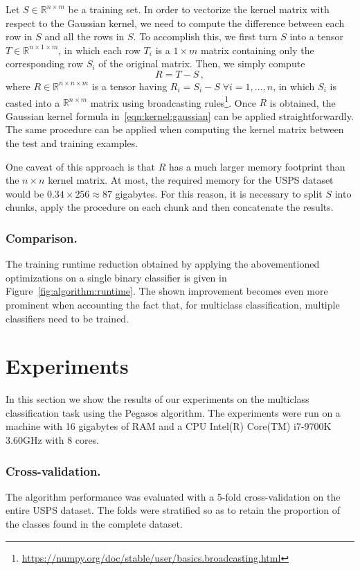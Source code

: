 \documentclass[runningheads]{llncs}
\begin{document}
Let $S \in \mathbb{R}^{n \times m}$ be a training set. In order to vectorize the kernel matrix with respect to the Gaussian kernel, we need to compute the difference between each row in $S$ and all the rows in $S$. To accomplish this, we first turn $S$ into a tensor $T \in \mathbb{R}^{n \times 1 \times m}$, in which each row $T_i$ is a $1 \times m$ matrix containing only the corresponding row $S_i$ of the original matrix. Then, we simply compute
\[
  R = T - S \, ,
\]
where $R \in \mathbb{R}^{n \times n \times m}$ is a tensor having $R_i = S_i - S \; \forall i=1,\dots,n$, in which $S_i$ is casted into a $\mathbb{R}^{n \times m}$ matrix using broadcasting rules\footnote{\url{https://numpy.org/doc/stable/user/basics.broadcasting.html}}. Once $R$ is obtained, the Gaussian kernel formula in~\ref{eqn:kernel:gaussian} can be applied straightforwardly. The same procedure can be applied when computing the kernel matrix between the test and training examples.

One caveat of this approach is that $R$ has a much larger memory footprint than the $n \times n$ kernel matrix. At most, the required memory for the USPS dataset would be $0.34 \times 256 \approx 87$ gigabytes. For this reason, it is necessary to split $S$ into chunks, apply the procedure on each chunk and then concatenate the results.

\subsubsection{Comparison.} The training runtime reduction obtained by applying the abovementioned optimizations on a single binary classifier is given in Figure~\ref{fig:algorithm:runtime}. The shown improvement becomes even more prominent when accounting the fact that, for multiclass classification, multiple classifiers need to be trained.

\section{Experiments}
\label{sec:experiments}

In this section we show the results of our experiments on the multiclass classification task using the Pegasos algorithm. The experiments were run on a machine with 16 gigabytes of RAM and a CPU Intel(R) Core(TM) i7-9700K 3.60GHz with 8 cores.

\subsubsection{Cross-validation.} The algorithm performance was evaluated with a 5-fold cross-validation on the entire USPS dataset. The folds were stratified so as to retain the proportion of the classes found in the complete dataset.
\end{document}
